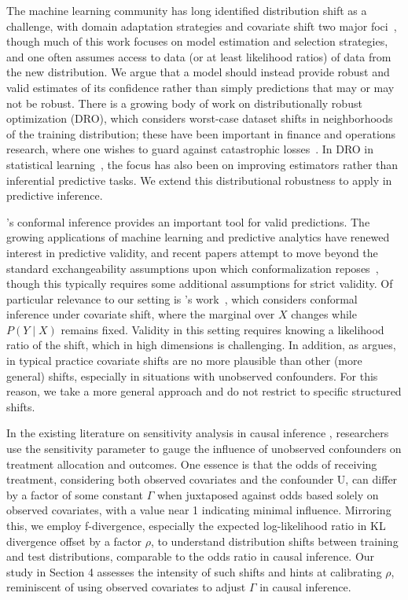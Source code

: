 The machine learning community has long identified distribution shift as a
challenge, with domain adaptation strategies and covariate shift two
major foci~\cite{SugiyamaKrMu07, Quionero-CandelaSuSc09}, though much of this work
focuses on model estimation and selection strategies, and one often assumes
access to data (or at least likelihood ratios) of data from the new
distribution. We argue that a model should instead provide robust and valid
estimates of its confidence rather than simply predictions that may or may
not be robust. There is a growing body of work on distributionally
robust optimization (DRO), which considers worst-case dataset shifts in
neighborhoods of the training distribution; these have been
important in finance and operations research, where one wishes to guard
against catastrophic losses~\cite{RockafellarUr00,
  BertsimasGuKa18}. In DRO in statistical
learning~\cite{BlanchetMu19, DuchiNa21}, the focus has also been on improving
estimators rather than inferential predictive tasks.  We extend
this distributional robustness to apply in predictive
inference.

\citet{VovkGaSh05}'s conformal inference provides an important tool for
valid predictions.  The growing applications of machine learning and
predictive analytics have renewed interest in predictive validity, and
recent papers attempt to move beyond the standard exchangeability
assumptions upon which conformalization reposes~\cite{TibshiraniBaCaRa19,
  ChernozhukovWuZh18}, though this typically requires some additional
assumptions for strict validity.  Of particular relevance to our setting is
\citeauthor{TibshiraniBaCaRa19}'s work~\cite{TibshiraniBaCaRa19}, which
considers conformal inference under covariate shift, where the marginal over
$X$ changes while $P(Y \mid X)$ remains fixed. Validity in this setting
requires knowing a likelihood ratio of the shift, which in high dimensions
is challenging.  In addition, as \citet{Jordan19} argues, in typical
practice covariate shifts are no more plausible than other (more general)
shifts, especially in situations with unobserved confounders. For this
reason, we take a more general approach and do not restrict to specific
structured shifts.

In the existing literature on sensitivity analysis in causal inference \citep{Imbens03,VeitchZa20,HsuSm13}, researchers use the sensitivity parameter to gauge the influence of unobserved confounders on treatment allocation and outcomes. One essence is that the odds of receiving treatment, considering both observed covariates and the confounder U, can differ by a factor of some constant $\Gamma$ when juxtaposed against odds based solely on observed covariates, with a value near 1 indicating minimal influence. Mirroring this, we employ f-divergence, especially the expected log-likelihood ratio in KL divergence offset by a factor $\rho$, to understand distribution shifts between training and test distributions, comparable to the odds ratio in causal inference. Our study in Section 4 assesses the intensity of such shifts and hints at calibrating $\rho$, reminiscent of using observed covariates to adjust $\Gamma$ in causal inference.



